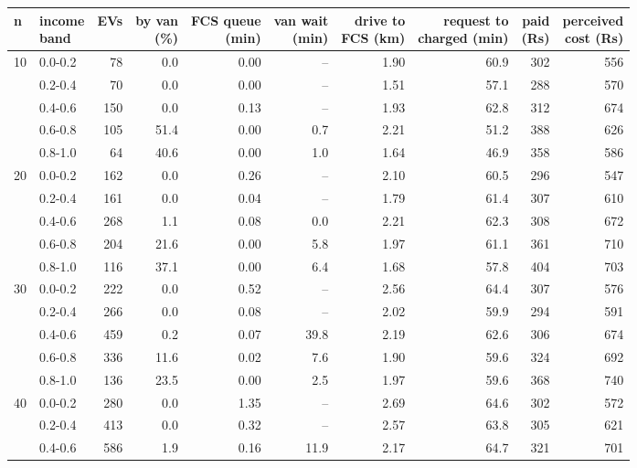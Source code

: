 \begin{tabular}{@{}llrrrrrrrr@{}}
\toprule
n & \shortstack[l]{income\\band} & EVs & \shortstack[r]{by van\\(\%)} & \shortstack[r]{FCS queue\\(min)} & \shortstack[r]{van wait\\(min)} & \shortstack[r]{drive to\\FCS (km)} & \shortstack[r]{request to\\charged (min)} & \shortstack[r]{paid\\(Rs)} & \shortstack[r]{perceived\\cost (Rs)} \\
\midrule
10 & 0.0-0.2 & 78 & 0.0 & 0.00 & -- & 1.90 & 60.9 & 302 & 556 \\
 & 0.2-0.4 & 70 & 0.0 & 0.00 & -- & 1.51 & 57.1 & 288 & 570 \\
 & 0.4-0.6 & 150 & 0.0 & 0.13 & -- & 1.93 & 62.8 & 312 & 674 \\
 & 0.6-0.8 & 105 & 51.4 & 0.00 & 0.7 & 2.21 & 51.2 & 388 & 626 \\
 & 0.8-1.0 & 64 & 40.6 & 0.00 & 1.0 & 1.64 & 46.9 & 358 & 586 \\
\midrule
20 & 0.0-0.2 & 162 & 0.0 & 0.26 & -- & 2.10 & 60.5 & 296 & 547 \\
 & 0.2-0.4 & 161 & 0.0 & 0.04 & -- & 1.79 & 61.4 & 307 & 610 \\
 & 0.4-0.6 & 268 & 1.1 & 0.08 & 0.0 & 2.21 & 62.3 & 308 & 672 \\
 & 0.6-0.8 & 204 & 21.6 & 0.00 & 5.8 & 1.97 & 61.1 & 361 & 710 \\
 & 0.8-1.0 & 116 & 37.1 & 0.00 & 6.4 & 1.68 & 57.8 & 404 & 703 \\
\midrule
30 & 0.0-0.2 & 222 & 0.0 & 0.52 & -- & 2.56 & 64.4 & 307 & 576 \\
 & 0.2-0.4 & 266 & 0.0 & 0.08 & -- & 2.02 & 59.9 & 294 & 591 \\
 & 0.4-0.6 & 459 & 0.2 & 0.07 & 39.8 & 2.19 & 62.6 & 306 & 674 \\
 & 0.6-0.8 & 336 & 11.6 & 0.02 & 7.6 & 1.90 & 59.6 & 324 & 692 \\
 & 0.8-1.0 & 136 & 23.5 & 0.00 & 2.5 & 1.97 & 59.6 & 368 & 740 \\
\midrule
40 & 0.0-0.2 & 280 & 0.0 & 1.35 & -- & 2.69 & 64.6 & 302 & 572 \\
 & 0.2-0.4 & 413 & 0.0 & 0.32 & -- & 2.57 & 63.8 & 305 & 621 \\
 & 0.4-0.6 & 586 & 1.9 & 0.16 & 11.9 & 2.17 & 64.7 & 321 & 701 \\

\end{tabular}
